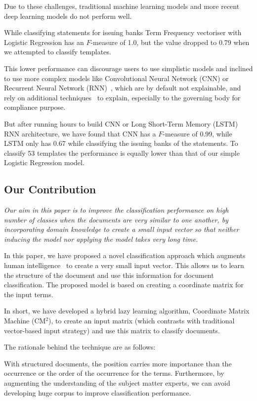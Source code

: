 \documentclass[runningheads]{llncs}
\begin{document}
Due to these challenges, traditional machine learning models and more recent deep learning models do not perform well. 
\begin{example}
While classifying statements for issuing banks Term Frequency vectoriser with Logistic Regression has an $F$-measure of 1.0, but the value dropped to 0.79 when we attempted to classify templates. 
\end{example}

This lower performance can discourage users to use simplistic models and inclined to use more complex models like Convolutional Neural Network (CNN) or Recurrent Neural Network (RNN)~\cite{banerjee2019,kumar2019}, which are by default not explainable, and rely on additional techniques~\cite{ribeiro2016} to explain, especially to the governing body for compliance purpose.
\begin{example}
But after running hours to build CNN or Long Short-Term Memory (LSTM) RNN architecture, we have found that CNN has a $F$-measure of 0.99, while LSTM only has 0.67 while classifying the issuing banks of the statements. To classify 53 templates the performance is equally lower than that of our simple Logistic Regression model.
\end{example}

\subsection{Our Contribution}
\textit{Our aim in this paper is to improve the classification performance on high number of classes when the documents are very similar to one another, by incorporating domain knowledge to create a small input vector so that neither inducing the model nor applying the model takes very long time.}

In this paper, we have proposed a novel classification approach which augments human intelligence~\cite{zheng2017} to create a very small input vector. This allows us to learn the structure of the document and use this information for document classification. The proposed model is based on creating a coordinate matrix for the input terms.

In short, we have developed a hybrid lazy learning algorithm, Coordinate Matrix Machine (CM$^2$), to create an input matrix (which contrasts with traditional vector-based input strategy) and use this matrix to classify documents.

The rationale behind the technique are as follows:
\begin{remark}
With structured documents, the position carries more importance than the occurrence or the order of the occurrence for the terms. Furthermore, by augmenting the understanding of the subject matter experts, we can avoid developing huge corpus to improve classification performance.
\end{remark}
\end{document}
